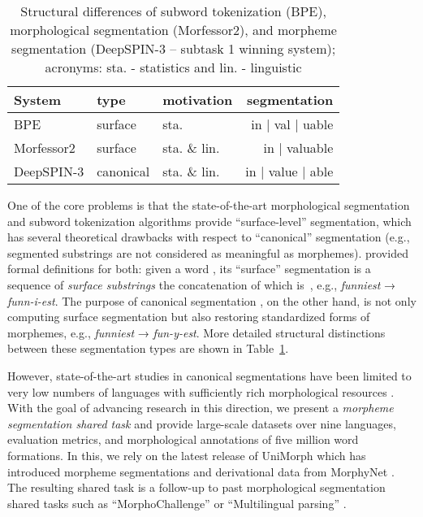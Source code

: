 \documentclass[11pt]{article}
\begin{document}
\begin{table}[t]
\small
{}
\centering
\begin{tabularx}{\linewidth}{l|ll|r}

System & type   & motivation   & segmentation             \\
\hline
\hline
BPE  & surface & sta. & in | val | uable       \\
Morfessor2  & surface    & sta. \& lin. & in | valuable         \\
DeepSPIN-3  & canonical & sta. \& lin. & in | value | able      \\

\hline
\end{tabularx}
\caption{\label{tab:examples} Structural differences of subword tokenization (BPE), morphological segmentation (Morfessor2), and morpheme segmentation (DeepSPIN-3 -- subtask 1 winning system); acronyms: sta. - statistics and lin. - linguistic}
\end{table}

One of the core problems is that the state-of-the-art morphological segmentation and subword tokenization algorithms provide  ``surface-level'' segmentation, which has several theoretical drawbacks  with respect to ``canonical'' segmentation (e.g., segmented substrings are not considered as meaningful as morphemes). \citet{cotterell2016joint} provided formal definitions for both:
given a word , its ``surface'' segmentation is a sequence of \textit{surface substrings} the concatenation of which is~, e.g., \textit{funniest} → \textit{funn-i-est}. The purpose of canonical segmentation \cite{kann-etal-2016-neural,Task2-TueSeg}, on the other hand, is not only computing surface segmentation but also restoring standardized forms of morphemes, e.g., \textit{funniest} → \textit{fun-y-est}. More detailed structural distinctions between these segmentation types are shown in Table~\ref{tab:examples}. 

However, state-of-the-art studies in canonical segmentations have been limited to very low numbers of languages with sufficiently rich morphological resources \cite{kurimo2010morpho,kurimo2010proceedings,cotterell2016joint,kann-etal-2018-fortification}. With the goal of advancing research in this direction, we present a \textit{morpheme segmentation shared task} and provide large-scale datasets over nine languages, evaluation metrics, and morphological annotations of five million word formations. In this, we rely on the latest release of UniMorph \cite{batsuren2022unimorph} which has introduced morpheme segmentations and derivational data from MorphyNet \cite{batsuren-etal-2021-morphynet}. The resulting shared task is a follow-up to past morphological segmentation shared tasks such as ``MorphoChallenge'' \cite{kurimo2007unsupervised,kurimo2008overview,kurimo2009overview} or ``Multilingual parsing''  \cite[where lemmatization as segmentation is a subtask]{zeman2017conll}.
\end{document}
